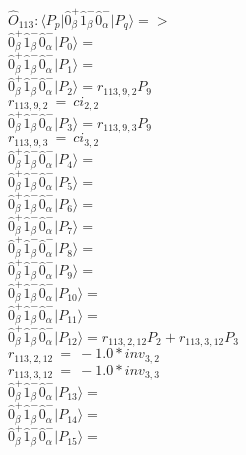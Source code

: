 \documentclass[14pt]{article}
\begin{document}
    $\hat{O}_{113}:  \langle{P_p}\vert \hat{0}_{\beta}^{+}\hat{1}_{\beta}^{-}\hat{0}_{\alpha}^{-} \vert{P_q}\rangle => $ \\ 
    $ \hat{0}_{\beta}^{+}\hat{1}_{\beta}^{-}\hat{0}_{\alpha}^{-} \vert{P_{0}}\rangle =  $ \\ 
    $ \hat{0}_{\beta}^{+}\hat{1}_{\beta}^{-}\hat{0}_{\alpha}^{-} \vert{P_{1}}\rangle =  $ \\ 
    $ \hat{0}_{\beta}^{+}\hat{1}_{\beta}^{-}\hat{0}_{\alpha}^{-} \vert{P_{2}}\rangle = {r}_{113,9,2}P_{9} $ \\ 
    ${r}_{113,9,2}\ =\ {ci}_{2,2} $ \\ 
    $ \hat{0}_{\beta}^{+}\hat{1}_{\beta}^{-}\hat{0}_{\alpha}^{-} \vert{P_{3}}\rangle = {r}_{113,9,3}P_{9} $ \\ 
    ${r}_{113,9,3}\ =\ {ci}_{3,2} $ \\ 
    $ \hat{0}_{\beta}^{+}\hat{1}_{\beta}^{-}\hat{0}_{\alpha}^{-} \vert{P_{4}}\rangle =  $ \\ 
    $ \hat{0}_{\beta}^{+}\hat{1}_{\beta}^{-}\hat{0}_{\alpha}^{-} \vert{P_{5}}\rangle =  $ \\ 
    $ \hat{0}_{\beta}^{+}\hat{1}_{\beta}^{-}\hat{0}_{\alpha}^{-} \vert{P_{6}}\rangle =  $ \\ 
    $ \hat{0}_{\beta}^{+}\hat{1}_{\beta}^{-}\hat{0}_{\alpha}^{-} \vert{P_{7}}\rangle =  $ \\ 
    $ \hat{0}_{\beta}^{+}\hat{1}_{\beta}^{-}\hat{0}_{\alpha}^{-} \vert{P_{8}}\rangle =  $ \\ 
    $ \hat{0}_{\beta}^{+}\hat{1}_{\beta}^{-}\hat{0}_{\alpha}^{-} \vert{P_{9}}\rangle =  $ \\ 
    $ \hat{0}_{\beta}^{+}\hat{1}_{\beta}^{-}\hat{0}_{\alpha}^{-} \vert{P_{10}}\rangle =  $ \\ 
    $ \hat{0}_{\beta}^{+}\hat{1}_{\beta}^{-}\hat{0}_{\alpha}^{-} \vert{P_{11}}\rangle =  $ \\ 
    $ \hat{0}_{\beta}^{+}\hat{1}_{\beta}^{-}\hat{0}_{\alpha}^{-} \vert{P_{12}}\rangle = {r}_{113,2,12}P_{2}+{r}_{113,3,12}P_{3} $ \\ 
    ${r}_{113,2,12}\ =\ -1.0*{inv}_{3,2} $ \\ 
    ${r}_{113,3,12}\ =\ -1.0*{inv}_{3,3} $ \\ 
    $ \hat{0}_{\beta}^{+}\hat{1}_{\beta}^{-}\hat{0}_{\alpha}^{-} \vert{P_{13}}\rangle =  $ \\ 
    $ \hat{0}_{\beta}^{+}\hat{1}_{\beta}^{-}\hat{0}_{\alpha}^{-} \vert{P_{14}}\rangle =  $ \\ 
    $ \hat{0}_{\beta}^{+}\hat{1}_{\beta}^{-}\hat{0}_{\alpha}^{-} \vert{P_{15}}\rangle =  $ \\ 
    
\end{document}
